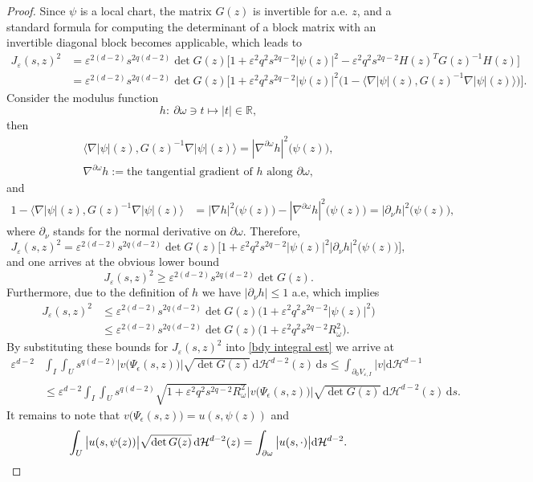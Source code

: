 \documentclass[11pt,oneside,reqno,a4paper]{amsart}
\newcommand{\dd}{\mathrm{d}}
\newcommand{\R}{\mathbb{R}}
\renewcommand{\H}{\mathcal{H}}
\newcommand{\eps}{\varepsilon}
\theoremstyle{definition}
\begin{document}
\begin{proof}
	Since $\psi$ is a local chart, the matrix $G (z)$ is invertible for a.e. $z$, and a standard formula for computing the determinant of a block matrix with an invertible diagonal block
	becomes applicable, which leads to
	\begin{align*}
		J_\eps(s,z)^2&=\eps^{2(d-2)}s^{2q(d-2)}\det G(z)\Big[ 1+\eps^2q^2s^{2q-2}\big|\psi(z)\big|^2
		-\eps^2q^2s^{2q-2} H(z)^T G(z)^{-1} H(z)\Big]\\
		&=\eps^{2(d-2)}s^{2q(d-2)}\det G(z)\Big[
		1+\eps^2q^2s^{2q-2}\big|\psi(z)\big|^2\Big( 1- \Big\langle \nabla|\psi|(z), G(z)^{-1} \nabla|\psi|(z)\Big\rangle\Big)\Big].
	\end{align*}
	Consider the modulus function
	\[
	h:\ \partial\omega\ni t\mapsto |t|\in \R,
	\]
	then
	\begin{gather*}
		\Big\langle \nabla|\psi|(z), G(z)^{-1} \nabla|\psi|(z)\Big\rangle=|\nabla^{\partial\omega}h|^2\big(\psi(z)\big),\\
		\nabla^{\partial\omega}h:=\text{the tangential gradient of $h$ along $\partial\omega$,}
	\end{gather*}
	and
	\begin{align*}
		1- \Big\langle \nabla|\psi|(z), G(z)^{-1} \nabla|\psi|(z)\Big\rangle&=
		|\nabla h|^2\big(\psi(z)\big)-|\nabla^{\partial\omega}h|^2\big(\psi(z)\big)=|\partial_{\nu}h|^2\big(\psi(z)\big),
	\end{align*}
	where $\partial_\nu$ stands for the normal derivative on $\partial\omega$. 
	Therefore,
	\[
	J_\eps(s,z)^2=\eps^{2(d-2)}s^{2q(d-2)}\det G(z)\Big[
	1+\eps^2q^2s^{2q-2}\big|\psi(z)\big|^2 |\partial_{\nu}h|^2\big(\psi(z)\big)\Big],
	\]
	and one arrives at the obvious lower bound
	\[
	J_\eps(s,z)^2\ge \eps^{2(d-2)}s^{2q(d-2)}\det G(z).
	\]
	Furthermore, due to the definition of $h$ we have $|\partial_\nu h|\le 1$ a.e,
	which implies
	\begin{align*}
		J_\eps(s,z)^2&\le \eps^{2(d-2)}s^{2q(d-2)}\det G(z)\Big(
		1+\eps^2q^2s^{2q-2}\big|\psi(z)\big|^2\Big)\\
		&\le
		\eps^{2(d-2)}s^{2q(d-2)}\det G(z) \Big(
		1+\eps^2q^2s^{2q-2} R_\omega^2\Big).
	\end{align*}
	By substituting these bounds for $J_\eps(s,z)^2$ into \eqref{bdy integral est}
	we arrive at
	\begin{align*}
		\eps^{d-2}&\int_I\int_U s^{q(d-2)}\Big|v\big(\Psi_{\epsilon}(s,z)\big)\Big|\sqrt{\det G(z)}
		\,\dd\H^{d-2}(z)\,\dd s			
		\leq\int_{\partial_0 V_{\eps,I}}|v|\dd\mathcal{H}^{d-1}
		\\
		&\leq\eps^{d-2}\int_I\int_U s^{q(d-2)}\sqrt{1+\eps^2q^2s^{2q-2}R^2_\omega}\Big|v\big(\Psi_{\epsilon}(s,z)\big)\Big|\sqrt{\det G(z)} \,\dd\H^{d-2}(z)\,\dd s. 
	\end{align*}
It remains to note that $v\big(\Psi_{\epsilon}(s,z)\big)=u(s,\psi(z))$ and
\[
\int_U \big|u(s,\psi(z))\big|\sqrt{\det G(z)} \,\dd\H^{d-2}(z)=\int_{\partial\omega} \big|u(s,\cdot)\big|\dd\H^{d-2}. \qedhere
\]
\end{proof}
\end{document}
